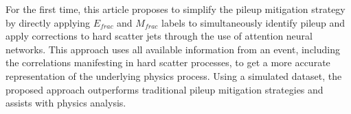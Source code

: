 
For the first time, this article proposes to simplify the pileup mitigation strategy by directly applying $E_{frac}$ and $M_{frac}$ labels to simultaneously identify pileup and apply corrections to hard scatter jets through the use of attention neural networks. This approach uses all available information from an event, including the correlations manifesting in hard scatter processes, to get a more accurate representation of the underlying physics process. Using a simulated dataset, the proposed approach outperforms traditional pileup mitigation strategies and assists with physics analysis.




